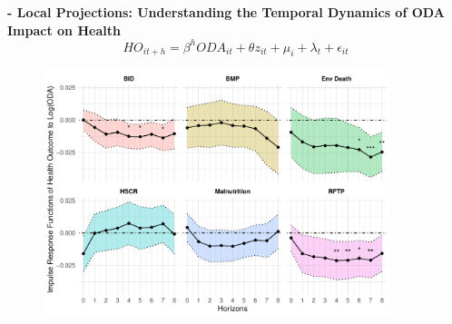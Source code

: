 \documentclass[aspectratio=169,handout, 10pt]{beamer}
\begin{document}
\begin{frame}%
\textbf{- Local Projections: Understanding the Temporal Dynamics of ODA Impact on Health}
\begin{equation}
HO_{it + h} = \beta^h ODA_{it} + \theta z_{it} + \mu_{i} + \lambda_{t} + \epsilon_{it}
\label{eq::local_projection}
\end{equation}
    \begin{figure}
        \includegraphics[width= 0.9\textwidth, height = 0.87\textheight]{Figures and Tables/Local_Projt.pdf}
        \end{figure}
\end{frame}
\end{document}
